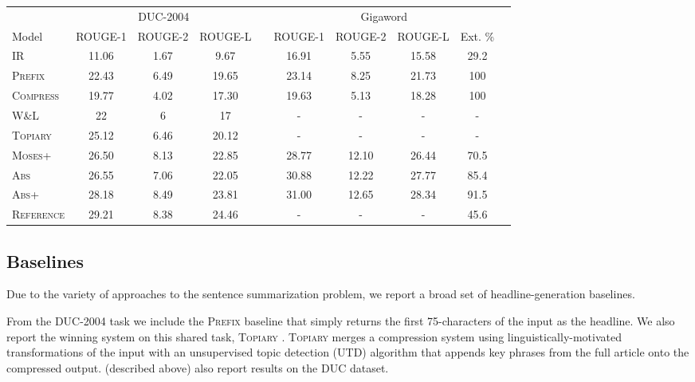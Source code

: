 \documentclass[11pt,a4paper]{article}
\begin{document}
\begin{table*}[ht!]
  \centering
  \footnotesize
  \begin{tabular}{lccccccccc}
    \toprule
                      & \multicolumn{3}{c}{DUC-2004 } && \multicolumn{4}{c}{Gigaword} \\
    Model             & ROUGE-1 & ROUGE-2 & ROUGE-L && ROUGE-1 & ROUGE-2 & ROUGE-L & Ext. \%  \\ 
    \midrule
    \textsc{IR}           & 11.06 & 1.67 & 9.67 && 16.91 &  5.55 &  15.58 & 29.2 \\  
    \textsc{Prefix}       & 22.43 & 6.49 & 19.65 &&  23.14 & 8.25 & 21.73 & 100 \\
    \textsc{Compress}     & 19.77 & 4.02 & 17.30 && 19.63 & 5.13 & 18.28   &  100 \\
    \textsc{W\&L}         & 22 & 6 & 17 && -   & -   & -   & -   \\
    \textsc{Topiary}      & 25.12 & 6.46 & 20.12 && -   & -   & -   & -  \\

    \textsc{Moses+}       & 26.50 & 8.13 & 22.85 && 28.77 & 12.10 & 26.44 & 70.5 \\
    \textsc{Abs}          & 26.55 & 7.06 & 22.05 &&  30.88& 12.22 & 27.77 & 85.4 \\
    \textsc{Abs+}         & 28.18 & 8.49 & 23.81 &&  31.00 & 12.65 & 28.34 & 91.5 \\ 
    \midrule

    \textsc{Reference}    & 29.21 & 8.38 & 24.46  &&  -  & -   & -   &  45.6 \\
    \bottomrule
  \end{tabular}
  
  \caption{\small \label{tab:results} Experimental results on the main summary tasks on various ROUGE metrics . Baseline models are described in detail in 
    Section~\ref{sec:baseline}. We report the percentage of tokens in the summary that also appear in the input for Gigaword as \texttt{Ext \%}.}
\end{table*}

\subsection{Baselines}
\label{sec:baseline}

Due to the variety of approaches to the sentence summarization
problem, we report a broad set of headline-generation baselines.

From the DUC-2004 task we include the \textsc{Prefix} baseline
that simply returns the first 75-characters of the input as the
headline.  We also report the winning system on this shared task,
\textsc{Topiary} \cite{zajic2004bbn}. \textsc{Topiary} merges a
compression system using linguistically-motivated transformations of
the input \cite{dorr2003hedge} with an unsupervised topic detection
(UTD) algorithm that appends key phrases from the full article onto
the compressed output.  (described above) also report results on the
DUC dataset.  
\end{document}

